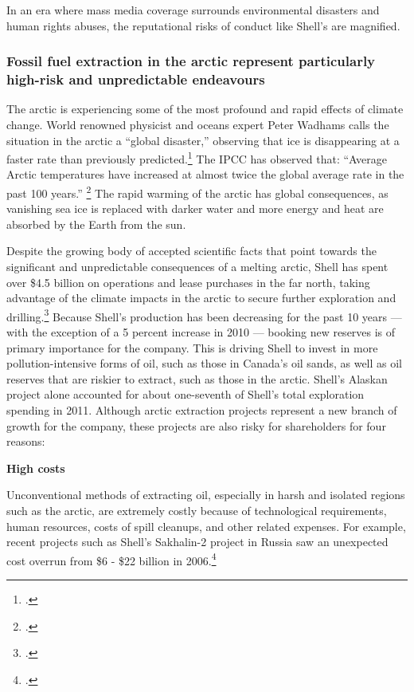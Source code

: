 In an era where mass media coverage surrounds environmental disasters and human rights abuses, the reputational risks of conduct like Shell's are magnified.



	\subsubsection{Fossil fuel extraction in the arctic represent particularly high-risk and unpredictable endeavours}



The arctic is experiencing some of the most profound and rapid effects of climate change.
World renowned physicist and oceans expert Peter Wadhams calls the situation in the arctic a ``global disaster,'' observing that ice is disappearing at a faster rate than previously predicted.\footcite{Wadhams2012}
The IPCC has observed that: ``Average Arctic temperatures have increased at almost twice the global average rate in the past 100 years.'' \footcite[][Climate Change 2007: Synthesis Report - Observed changes in climate and their effects]{IPCC2007}
The rapid warming of the arctic has global consequences, as vanishing sea ice is replaced with darker water and more energy and heat are absorbed by the Earth from the sun.


Despite the growing body of accepted scientific facts that point towards the significant and unpredictable consequences of a melting arctic, Shell has spent over \$4.5 billion on operations and lease purchases in the far north, taking advantage of the climate impacts in the arctic to secure further exploration and drilling.\footcite{ShellSuspends}
Because Shell's production has been decreasing for the past 10 years --- with the exception of a 5 percent increase in 2010  --- booking new reserves is of primary importance for the company.
This is driving Shell to invest in more pollution-intensive forms of oil, such as those in Canada's oil sands, as well as oil reserves that are riskier to extract, such as those in the arctic.
Shell's Alaskan project alone accounted for about one-seventh of Shell's total exploration spending in 2011. 
Although arctic extraction projects represent a new branch of growth for the company, these projects are also risky for shareholders for four reasons:



\textbf{High costs} 



Unconventional methods of extracting oil, especially in harsh and isolated regions such as the arctic, are extremely costly because of technological requirements, human resources, costs of spill cleanups, and other related expenses. 
For example, recent projects such as Shell's Sakhalin-2 project in Russia saw an unexpected cost overrun from \$6 - \$22 billion in 2006.\footcite[For more on these four central risk factors see: ][]{OutInTheCold_2012}



